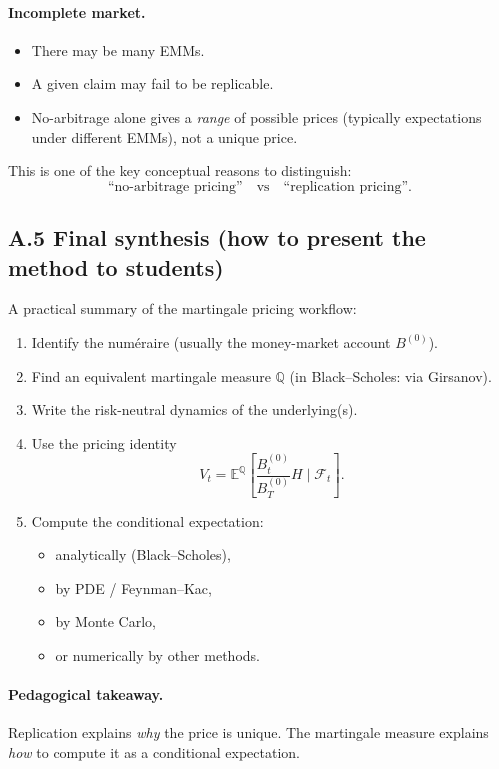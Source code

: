 \documentclass[11pt]{article}
\newcommand{\Qbb}{\mathbb{Q}}
\newcommand{\E}{\mathbb{E}}
\newcommand{\1}{\mathbf{1}}
\begin{document}
\paragraph{Incomplete market.}
\begin{itemize}[leftmargin=1.4em]
    \item There may be many EMMs.
    \item A given claim may fail to be replicable.
    \item No-arbitrage alone gives a \emph{range} of possible prices (typically expectations under different EMMs), not a unique price.
\end{itemize}

This is one of the key conceptual reasons to distinguish:
$$
\text{``no-arbitrage pricing''} \quad \text{vs} \quad \text{``replication pricing''}.
$$

\subsection*{A.5 Final synthesis (how to present the method to students)}

A practical summary of the martingale pricing workflow:

\begin{enumerate}[leftmargin=1.6em]
    \item Identify the num\'eraire (usually the money-market account \(B^{(0)}\)).
    \item Find an equivalent martingale measure \(\Qbb\) (in Black--Scholes: via Girsanov).
    \item Write the risk-neutral dynamics of the underlying(s).
    \item Use the pricing identity
    $$
    V_t=\E^{\Qbb}\!\left[\frac{B_t^{(0)}}{B_T^{(0)}}H\mid\mathcal F_t\right].
    $$
    \item Compute the conditional expectation:
    \begin{itemize}[leftmargin=1.4em]
        \item analytically (Black--Scholes),
        \item by PDE / Feynman--Kac,
        \item by Monte Carlo,
        \item or numerically by other methods.
    \end{itemize}
\end{enumerate}

\paragraph{Pedagogical takeaway.}
Replication explains \emph{why} the price is unique.
The martingale measure explains \emph{how} to compute it as a conditional expectation.
\end{document}

